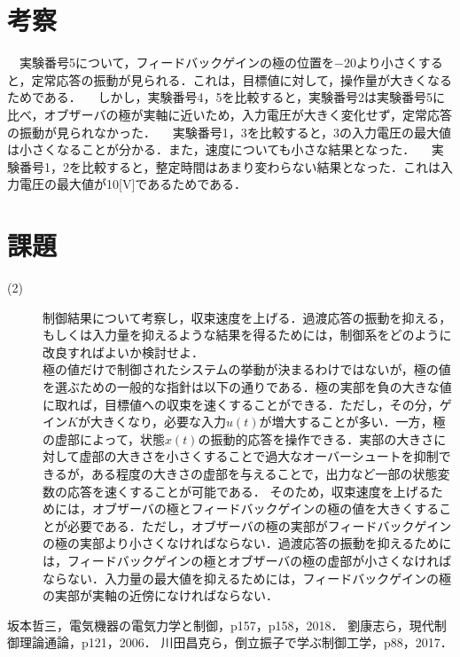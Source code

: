 \documentclass[12pt]{jsarticle}
\begin{document}
\newpage

\section{考察}
　実験番号5について，フィードバックゲインの極の位置を$-20$より小さくすると，定常応答の振動が見られる．これは，目標値に対して，操作量が大きくなるためである．
　しかし，実験番号4，5を比較すると，実験番号2は実験番号5に比べ，オブザーバの極が実軸に近いため，入力電圧が大きく変化せず，定常応答の振動が見られなかった．
　実験番号1，3を比較すると，3の入力電圧の最大値は小さくなることが分かる．また，速度についても小さな結果となった．
　実験番号1，2を比較すると，整定時間はあまり変わらない結果となった．これは入力電圧の最大値が10[V]であるためである．
\section{課題}
\begin{description}
  \item[(2)] 制御結果について考察し，収束速度を上げる．過渡応答の振動を抑える，もしくは入力量を抑えるような結果を得るためには，制御系をどのように改良すればよいか検討せよ．\\
  極の値だけで制御されたシステムの挙動が決まるわけではないが，極の値を選ぶための一般的な指針は以下の通りである．極の実部を負の大きな値に取れば，目標値への収束を速くすることができる．ただし，その分，ゲイン$K$が大きくなり，必要な入力$u(t)$が増大することが多い．一方，極の虚部によって，状態$x(t)$の振動的応答を操作できる．実部の大きさに対して虚部の大きさを小さくすることで過大なオーバーシュートを抑制できるが，ある程度の大きさの虚部を与えることで，出力など一部の状態変数の応答を速くすることが可能である\cite{bibitem_pendrol}．
  そのため，収束速度を上げるためには，オブザーバの極とフィードバックゲインの極の値を大きくすることが必要である．ただし，オブザーバの極の実部がフィードバックゲインの極の実部より小さくなければならない．過渡応答の振動を抑えるためには，フィードバックゲインの極とオブザーバの極の虚部が小さくなければならない．入力量の最大値を抑えるためには，フィードバックゲインの極の実部が実軸の近傍になければならない．
\end{description}

\begin{thebibliography}{9}
   坂本哲三，電気機器の電気力学と制御，p157，p158，2018．
   劉康志ら，現代制御理論通論，p121，2006．
   川田昌克ら，倒立振子で学ぶ制御工学，p88，2017．
\end{thebibliography}
\end{document}
